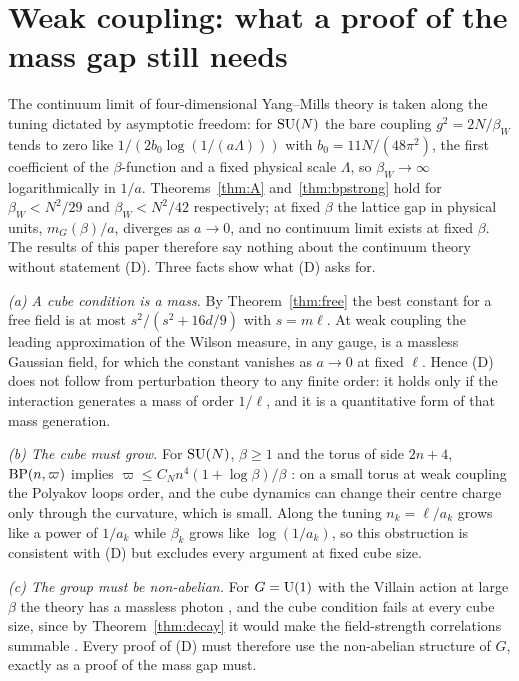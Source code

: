 \section{Weak coupling: what a proof of the mass gap still needs}\label{sec:weak}

The continuum limit of four-dimensional Yang--Mills theory is taken along the
tuning dictated by asymptotic freedom: for $\mathrm{SU}(N)$ the bare coupling
$g^2=2N/\beta_W$ tends to zero like $1/(2b_0\log(1/(a\Lambda)))$ with
$b_0=11N/(48\pi^2)$, the first coefficient of the $\beta$-function
\cite{GW73,Pol73} and a fixed physical scale $\Lambda$, so $\beta_W\to\infty$
logarithmically in $1/a$. Theorems~\ref{thm:A} and~\ref{thm:bpstrong} hold for
$\beta_W<N^2/29$ and $\beta_W<N^2/42$ respectively; at fixed $\beta$ the lattice
gap in physical units, $m_G(\beta)/a$, diverges as $a\to0$, and no continuum
limit exists at fixed $\beta$. The results of this paper therefore say nothing
about the continuum theory without statement (D). Three facts show what (D)
asks for.

\emph{(a) A cube condition is a mass.} By Theorem~\ref{thm:free} the best
constant for a free field is at most $s^2/(s^2+16d/9)$ with $s=m\ell$. At weak
coupling the leading approximation of the Wilson measure, in any gauge, is a
massless Gaussian field, for which the constant vanishes as $a\to0$ at fixed
$\ell$. Hence (D) does not follow from perturbation theory to any finite order:
it holds only if the interaction generates a mass of order $1/\ell$, and it is
a quantitative form of that mass generation.

\emph{(b) The cube must grow.} For $\mathrm{SU}(N)$, $\beta\ge1$ and the torus of side
$2n+4$, $\mathrm{BP}(n,\varpi)$ implies $\varpi\le C_Nn^4(1+\log\beta)/\beta$
\cite{BBLRS26}: on a small torus at weak coupling the Polyakov loops order, and
the cube dynamics can change their centre charge only through the curvature,
which is small. Along the tuning $n_k=\ell/a_k$ grows like a power of $1/a_k$
while $\beta_k$ grows like $\log(1/a_k)$, so this obstruction is consistent with
(D) but excludes every argument at fixed cube size.

\emph{(c) The group must be non-abelian.} For $G=\mathrm{U}(1)$ with the Villain
action at large $\beta$ the theory has a massless photon \cite{FS82}, and the
cube condition fails at every cube size, since by Theorem~\ref{thm:decay} it
would make the field-strength correlations summable \cite{BBLRS26}. Every proof
of (D) must therefore use the non-abelian structure of $G$, exactly as a proof
of the mass gap must.

